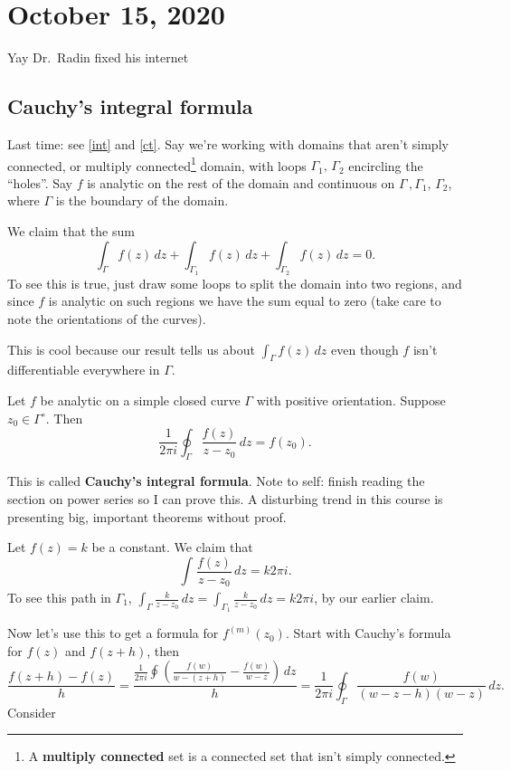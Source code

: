 \section{October 15, 2020}
Yay Dr.\ Radin fixed his internet
\subsection{Cauchy's integral formula}
Last time: see \cref{int} and \cref{ct}. Say we're working with domains that aren't simply connected, or multiply connected\footnote{A \textbf{multiply connected} set is a connected set that isn't simply connected.} domain, with loops $\Gamma_1,\,\Gamma_2  $ encircling the ``holes''. Say $f$ is analytic on the rest of the domain and continuous on $\Gamma\, ,\Gamma_1,\,\Gamma_2  $, where $\Gamma $ is the boundary of the domain.
\begin{claim}
    We claim that the sum \[
        \int_{\Gamma }^{} f(z) \, dz + \int_{\Gamma_1 }^{} f(z) \, dz + \int_{\Gamma_2 }^{} f(z) \, dz=0.
    \] To see this is true, just draw some loops to split the domain into two regions, and since $f$ is analytic on such regions we have the sum equal to zero (take care to note the orientations of the curves).
\end{claim}
This is cool because our result tells us about $\int_{\Gamma }^{} f(z) \, dz$ even though $f$ isn't differentiable everywhere in $\Gamma $.
\orbreak
\begin{theorem}\label{cif}
   Let $f$ be analytic on a simple closed curve $\Gamma $ with positive orientation. Suppose $z_0\in \Gamma ^{\circ }$. Then \[
       \frac{1}{2\pi i} \oint_{\Gamma }^{} \frac{f(z)}{z-z_0} \, dz=f(z_0).
   \] 
\end{theorem}
This is called \textbf{Cauchy's integral formula}. Note to self: finish reading the section on power series so I can prove this. A disturbing trend in this course is presenting big, important theorems without proof.
\begin{example}
    Let $f(z)=k$ be a constant. We claim that \[
        \int_{}^{} \frac{f(z)}{z-z_0} \, dz=k2\pi i.
    \] To see this path in $\Gamma_1 $, $\int_{\Gamma }^{} \frac{k}{z-z_0} \, dz=\int_{\Gamma_1 }^{} \frac{k}{z-z_0} \, dz=k2\pi i$, by our earlier claim.
\end{example}
Now let's use this to get a formula for $f^{(m)}(z_0)$. Start with Cauchy's formula for $f(z)$ and $f(z+h)$, then \[
    \frac{f(z+h)-f(z)}{h}=\frac{\frac{1}{2\pi i }\oint_{}^{} \left( \frac{f(w)}{w-(z+h)}-\frac{f(w)}{w-z} \right) \, dz 
}{h}=\frac{1}{2\pi i} \oint_{\Gamma }^{} \frac{f(w)}{(w-z-h)(w-z)} \, dz.
\] Consider 
